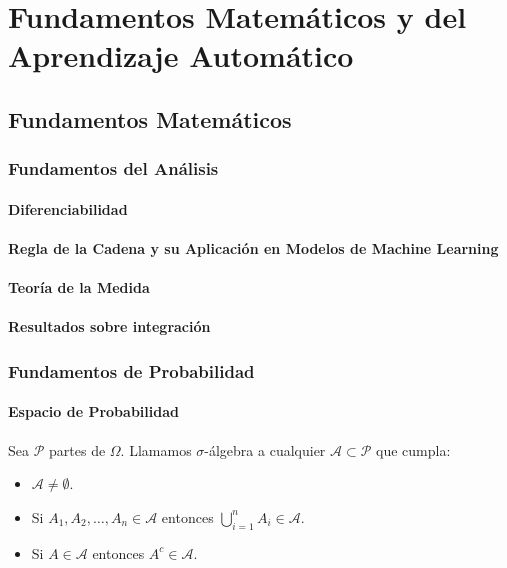 
\chapter{Fundamentos Matemáticos y del Aprendizaje Automático}

\section{Fundamentos Matemáticos}
\subsection{Fundamentos del Análisis}
\subsubsection{Diferenciabilidad}



\subsubsection{Regla de la Cadena y su Aplicación en Modelos de Machine Learning}
\subsubsection{Teoría de la Medida}
\subsubsection{Resultados sobre integración}

\subsection{Fundamentos de Probabilidad}

\subsubsection{Espacio de Probabilidad}
\begin{definition}
Sea $\mathcal{P}$ partes de $\Omega$. Llamamos $\sigma$-álgebra a cualquier $\mathcal{A} \subset \mathcal{P}$ que cumpla:
\begin{itemize}
\item $ \mathcal{A} \neq \emptyset$.
\item Si $A_1, A_2, \ldots, A_n \in \mathcal{A}$ entonces $\bigcup_{i=1}^n A_i \in \mathcal{A}$.
\item Si $A \in \mathcal{A}$ entonces $A^c \in \mathcal{A}$.
\end{itemize}
\end{definition}

